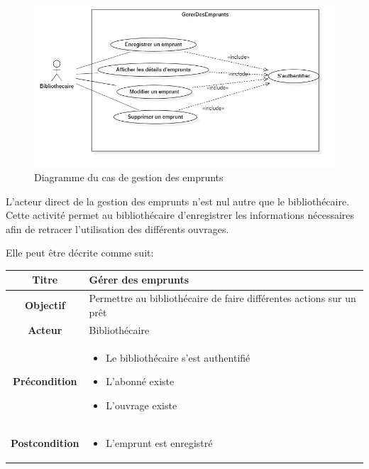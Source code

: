 \paragraph{}
\begin{figure}[h]
        \centering
        \includegraphics[width=1\textwidth]{gestionDesEmpruntsUseCase}
        \caption{Diagramme du cas de gestion des emprunts}
        \label{image-gestionDesEmpruntsUseCase}
        \end{figure}
\par
L'acteur direct de la gestion des emprunts n'est nul autre que le bibliothécaire. 
Cette activité permet au bibliothécaire d'enregistrer les informations nécessaires 
afin de retracer l'utilisation des différents ouvrages.\par 
Elle peut être décrite comme suit: \par 
\begin{tabular}{|c|p{7cm}|}
        \hline
        \textbf{Titre} & Gérer des emprunts \\
        \hline
        \textbf{Objectif} & Permettre au bibliothécaire de faire différentes actions sur un prêt \\
        \hline
        \textbf{Acteur} & Bibliothécaire \\
        \hline
        \textbf{Précondition} & \begin{itemize}
                \item Le bibliothécaire s'est authentifié 
                \item L'abonné existe
                \item L'ouvrage existe
        \end{itemize} \\
        \hline
        \textbf{Postcondition} & \begin{itemize}
                \item L'emprunt est enregistré 
        \end{itemize} \\
        \hline
\end{tabular}
